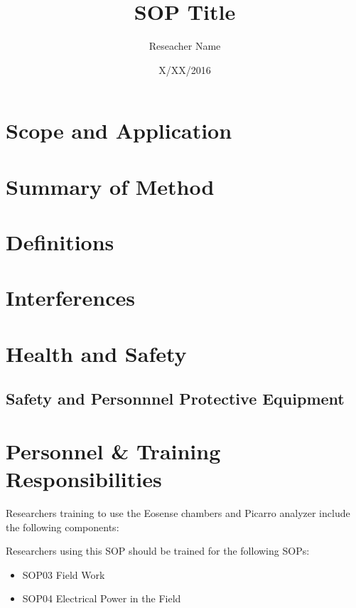 \documentclass[12pt]{../SOP3_beta}
\title{SOP Title}
\date{X/XX/2016}
\author{Reseacher Name}
\begin{document}


\maketitle

\section{Scope and Application}

\NP \blindtext

\section{Summary of Method}

\section{Definitions}

\NP \lipsum[1]

\section{Interferences}

\section{Health and Safety}

\NP \lipsum[2]

\subsection{Safety and Personnnel Protective Equipment}


\section{Personnel \& Training Responsibilities}

Researchers training to use the Eosense chambers and Picarro analyzer include the following components: 



Researchers using this SOP should be trained for the following SOPs:

\begin{itemize}
  \item SOP03 Field Work
  \item SOP04 Electrical Power in the Field
\end{itemize}
\end{document}
